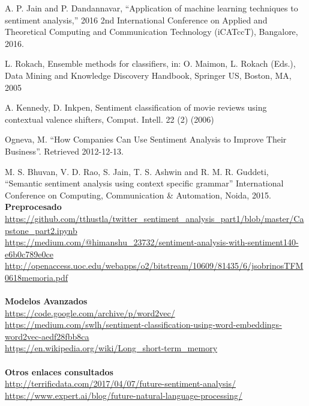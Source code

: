 \documentclass[a4paper,12pt]{report}
\begin{document}
\begin{thebibliography}{0}

 A. P. Jain and P. Dandannavar, ``Application of machine learning techniques to sentiment analysis,'' 2016 2nd International Conference on Applied and Theoretical Computing and Communication Technology (iCATccT), Bangalore, 2016.

 L. Rokach, Ensemble methods for classifiers, in: O. Maimon, L. Rokach (Eds.), Data Mining and Knowledge Discovery Handbook, Springer US, Boston,
MA, 2005

 A. Kennedy, D. Inkpen, Sentiment classification of movie reviews using contextual valence shifters, Comput. Intell. 22 (2) (2006)

 Ogneva, M. ``How Companies Can Use Sentiment Analysis to Improve
Their Business''. Retrieved 2012-12-13.

 M. S. Bhuvan, V. D. Rao, S. Jain, T. S. Ashwin and R. M. R. Guddeti, ``Semantic sentiment analysis using context specific grammar'' International Conference on Computing, Communication \& Automation, Noida, 2015.
\vspace{6mm}\\
\textbf{Preprocesado}
\vspace{2mm}
\\\url{https://github.com/tthustla/twitter_sentiment_analysis_part1/blob/master/Capstone_part2.ipynb}
\vspace{2mm}
\\\url{https://medium.com/@himanshu_23732/sentiment-analysis-with-sentiment140-e6b0c789e0ce}
\vspace{2mm}
\\\url{http://openaccess.uoc.edu/webapps/o2/bitstream/10609/81435/6/jsobrinosTFM0618memoria.pdf}
\vspace{2mm}\\
\\\textbf{Modelos Avanzados}
\vspace{2mm}
\\\url{https://code.google.com/archive/p/word2vec/}
\vspace{2mm}
\\\url{https://medium.com/swlh/sentiment-classification-using-word-embeddings-word2vec-aedf28fbb8ca}
\vspace{2mm}
\\\url{https://en.wikipedia.org/wiki/Long_short-term_memory}
\vspace{2mm}\\
\\\textbf{Otros enlaces consultados}
\vspace{2mm}
\\\url{http://terrificdata.com/2017/04/07/future-sentiment-analysis/}
\vspace{2mm}
\\\url{https://www.expert.ai/blog/future-natural-language-processing/}

\end{thebibliography}
\end{document}
